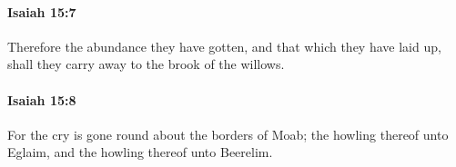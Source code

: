 		\paragraph{Isaiah 15:7} %
			\label{ISAIAH-15-7}

			Therefore the abundance they have gotten, and that which they have laid up, shall they carry away to the brook of the willows.


		\paragraph{Isaiah 15:8} %
			\label{ISAIAH-15-8}

			For the cry is gone round about the borders of Moab; the howling thereof unto Eglaim, and the howling thereof unto Beerelim.


